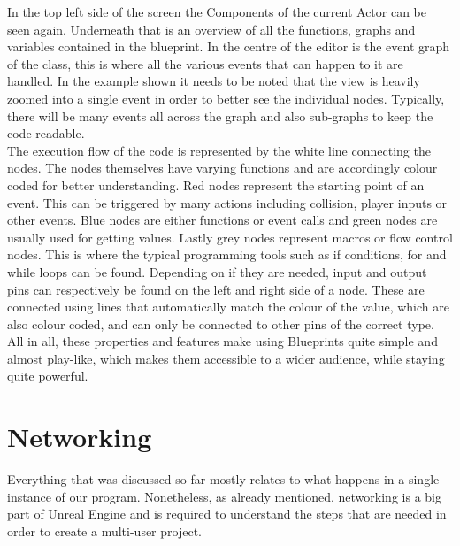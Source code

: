 In the top left side of the screen the Components of the current Actor can be seen again. Underneath that is an overview of all the functions, graphs and variables contained in the blueprint. In the centre of the editor is the event graph of the class, this is where all the various events that can happen to it are handled. In the example shown it needs to be noted that the view is heavily zoomed into a single event in order to better see the individual nodes. Typically, there will be many events all across the graph and also sub-graphs to keep the code readable.\\
The execution flow of the code is represented by the white line connecting the nodes. The nodes themselves have varying functions and are accordingly colour coded for better understanding. Red nodes represent the starting point of an event. This can be triggered by many actions including collision, player inputs or other events. Blue nodes are either functions or event calls and green nodes are usually used for getting values. Lastly grey nodes represent macros or flow control nodes. This is where the typical programming tools such as if conditions, for and while loops can be found.
Depending on if they are needed, input and output pins can respectively be found on the left and right side of a node. These are connected using lines that automatically match the colour of the value, which are also colour coded, and can only be connected to other pins of the correct type.\\
All in all, these properties and features make using Blueprints quite simple and almost play-like, which makes them accessible to a wider audience, while staying quite powerful.

\section{Networking}

Everything that was discussed so far mostly relates to what happens in a single instance of our program. Nonetheless, as already mentioned, networking is a big part of Unreal Engine and is required to understand the steps that are needed in order to create a multi-user project.\\

